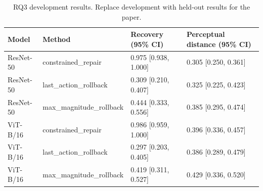 \begin{table}[t]
\centering
\caption{RQ3 development results. Replace development with held-out results for the paper.}
\label{tab:rq3}
\begin{tabular}{llll}
\toprule
Model & Method & Recovery (95\% CI) & Perceptual distance (95\% CI) \\
\midrule
ResNet-50 & constrained\_repair & 0.975 [0.938, 1.000] & 0.305 [0.250, 0.361] \\
ResNet-50 & last\_action\_rollback & 0.309 [0.210, 0.407] & 0.325 [0.225, 0.423] \\
ResNet-50 & max\_magnitude\_rollback & 0.444 [0.333, 0.556] & 0.385 [0.295, 0.474] \\
ViT-B/16 & constrained\_repair & 0.986 [0.959, 1.000] & 0.396 [0.336, 0.457] \\
ViT-B/16 & last\_action\_rollback & 0.297 [0.203, 0.405] & 0.386 [0.289, 0.479] \\
ViT-B/16 & max\_magnitude\_rollback & 0.419 [0.311, 0.527] & 0.429 [0.336, 0.520] \\
\bottomrule
\end{tabular}
\end{table}
